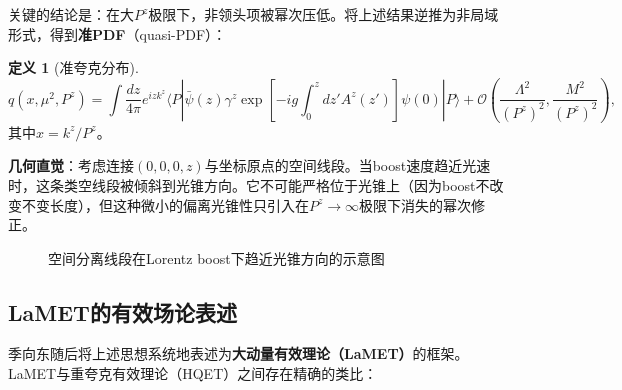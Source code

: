 \documentclass[12pt,a4paper]{ctexart}
\theoremstyle{definition}
\newtheorem{definition}{定义}[section]
\begin{document}
关键的结论是：在大$P^z$极限下，非领头项被幂次压低。将上述结果逆推为非局域形式，得到\textbf{准PDF}（quasi-PDF）\cite{Ji2013Euclidean}：

\begin{definition}[准夸克分布]
\begin{equation}
q(x, \mu^2, P^z) = \int \frac{dz}{4\pi} e^{izk^z} \langle P| \bar{\psi}(z) \gamma^z \exp\left[-ig\int_0^z dz' A^z(z')\right] \psi(0) |P\rangle + \mathcal{O}\left(\frac{\Lambda^2}{(P^z)^2}, \frac{M^2}{(P^z)^2}\right),
\label{eq:quasi_pdf}
\end{equation}
其中$x = k^z/P^z$。
\end{definition}

\textbf{几何直觉}\cite{Ji2013Euclidean, Ji2014LaMET}：考虑连接$(0,0,0,z)$与坐标原点的空间线段。当boost速度趋近光速时，这条类空线段被倾斜到光锥方向。它不可能严格位于光锥上（因为boost不改变不变长度），但这种微小的偏离光锥性只引入在$P^z \to \infty$极限下消失的幂次修正。

\begin{figure}[H]
\centering
{}
\caption{空间分离线段在Lorentz boost下趋近光锥方向的示意图}
\label{fig:boost_to_lightcone}
\end{figure}

\subsection{LaMET的有效场论表述}

季向东随后将上述思想系统地表述为\textbf{大动量有效理论（LaMET）}的框架\cite{Ji2014LaMET}。LaMET与重夸克有效理论（HQET）之间存在精确的类比：
\end{document}
